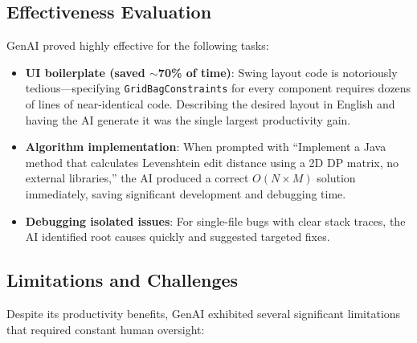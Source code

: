 \documentclass[12pt, a4paper]{article}
\begin{document}
\subsection{Effectiveness Evaluation}
GenAI proved highly effective for the following tasks:
\begin{itemize}
    \item \textbf{UI boilerplate (saved $\sim$70\% of time)}: Swing layout code is notoriously tedious---specifying \texttt{GridBagConstraints} for every component requires dozens of lines of near-identical code. Describing the desired layout in English and having the AI generate it was the single largest productivity gain.
    \item \textbf{Algorithm implementation}: When prompted with ``Implement a Java method that calculates Levenshtein edit distance using a 2D DP matrix, no external libraries,'' the AI produced a correct $O(N \times M)$ solution immediately, saving significant development and debugging time.
    \item \textbf{Debugging isolated issues}: For single-file bugs with clear stack traces, the AI identified root causes quickly and suggested targeted fixes.
\end{itemize}

\subsection{Limitations and Challenges}

Despite its productivity benefits, GenAI exhibited several significant limitations that required constant human oversight:
\end{document}
